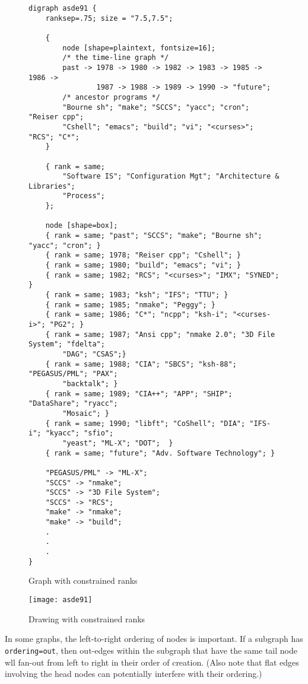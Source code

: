 \documentclass[11pt]{article}
\begin{document}
\begin{figure}[p]
\scriptsize
\begin{verbatim}
digraph asde91 {
    ranksep=.75; size = "7.5,7.5";

    {
        node [shape=plaintext, fontsize=16];
        /* the time-line graph */
        past -> 1978 -> 1980 -> 1982 -> 1983 -> 1985 -> 1986 ->
                1987 -> 1988 -> 1989 -> 1990 -> "future";
        /* ancestor programs */
        "Bourne sh"; "make"; "SCCS"; "yacc"; "cron"; "Reiser cpp";
        "Cshell"; "emacs"; "build"; "vi"; "<curses>"; "RCS"; "C*";
    }

    { rank = same;
        "Software IS"; "Configuration Mgt"; "Architecture & Libraries";
        "Process";
    };

    node [shape=box];
    { rank = same; "past"; "SCCS"; "make"; "Bourne sh"; "yacc"; "cron"; }
    { rank = same; 1978; "Reiser cpp"; "Cshell"; }
    { rank = same; 1980; "build"; "emacs"; "vi"; }
    { rank = same; 1982; "RCS"; "<curses>"; "IMX"; "SYNED"; }
    { rank = same; 1983; "ksh"; "IFS"; "TTU"; }
    { rank = same; 1985; "nmake"; "Peggy"; }
    { rank = same; 1986; "C*"; "ncpp"; "ksh-i"; "<curses-i>"; "PG2"; }
    { rank = same; 1987; "Ansi cpp"; "nmake 2.0"; "3D File System"; "fdelta";
        "DAG"; "CSAS";}
    { rank = same; 1988; "CIA"; "SBCS"; "ksh-88"; "PEGASUS/PML"; "PAX";
        "backtalk"; }
    { rank = same; 1989; "CIA++"; "APP"; "SHIP"; "DataShare"; "ryacc";
        "Mosaic"; }
    { rank = same; 1990; "libft"; "CoShell"; "DIA"; "IFS-i"; "kyacc"; "sfio";
        "yeast"; "ML-X"; "DOT";  }
    { rank = same; "future"; "Adv. Software Technology"; }

    "PEGASUS/PML" -> "ML-X";
    "SCCS" -> "nmake";
    "SCCS" -> "3D File System";
    "SCCS" -> "RCS";
    "make" -> "nmake";
    "make" -> "build";
    .
    .
    .
}
\end{verbatim}
\caption{Graph with constrained ranks}
\label{fig:asde91}
\end{figure}

\begin{figure}[p]
	\centerline {
		\texttt{[image: asde91]}
	}
    \caption{Drawing with constrained ranks}
    \label{fig:asde91drawing}
\end{figure}

In some graphs, the left-to-right ordering of nodes is important.
If a subgraph has \verb"ordering=out", then out-edges within the
subgraph that have the same tail node wll fan-out from left to right
in their order of creation. (Also note that flat edges involving the
head nodes can potentially interfere with their ordering.)
\end{document}
